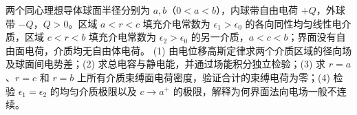 两个同心理想导体球面半径分别为 \(a,b\)（\(0<a<b\)），内球带自由电荷 \(+Q\)，外球带 \(-Q\)，\(Q>0\)。区域 \(a<r<c\) 填充介电常数为 \(\epsilon_1>\epsilon_0\) 的各向同性均匀线性电介质，区域 \(c<r<b\) 填充介电常数为 \(\epsilon_2>\epsilon_0\) 的另一介质，\(a<c<b\)；界面没有自由面电荷，介质均无自由体电荷。
(1) 由电位移高斯定律求两个介质区域的径向场及球面间电势差；(2) 求总电容与静电能，并通过场能积分独立检验；(3) 求 \(r=a\)、\(r=c\) 和 \(r=b\) 上所有介质束缚面电荷密度，验证合计的束缚电荷为零；(4) 检验 \(\epsilon_1=\epsilon_2\) 的均匀介质极限以及 \(c\to a^+\) 的极限，解释为何界面法向电场一般不连续。
